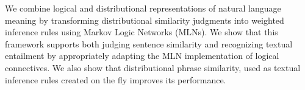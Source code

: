 We combine logical and distributional representations of natural language meaning by transforming distributional similarity judgments into weighted
 inference rules using Markov Logic Networks (MLNs). We show that this framework
 supports both judging sentence similarity and recognizing textual entailment by
 appropriately adapting the MLN implementation of logical connectives. We also
 show that distributional phrase similarity, used as textual inference rules
 created on the fly improves its performance.

